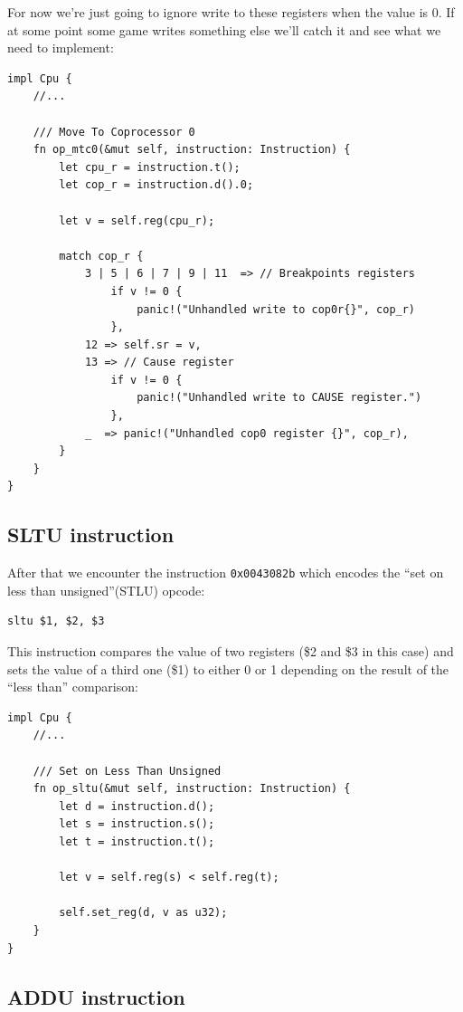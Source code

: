 \documentclass[a4paper]{article}
\newcommand{\code}[1] {\texttt{#1}}
\begin{document}
For now we're just going to ignore write to these registers when the
value is 0. If at some point some game writes something else we'll
catch it and see what we need to implement:

\begin{lstlisting}
impl Cpu {
    //...

    /// Move To Coprocessor 0
    fn op_mtc0(&mut self, instruction: Instruction) {
        let cpu_r = instruction.t();
        let cop_r = instruction.d().0;

        let v = self.reg(cpu_r);

        match cop_r {
            3 | 5 | 6 | 7 | 9 | 11  => // Breakpoints registers
                if v != 0 {
                    panic!("Unhandled write to cop0r{}", cop_r)
                },
            12 => self.sr = v,
            13 => // Cause register
                if v != 0 {
                    panic!("Unhandled write to CAUSE register.")
                },
            _  => panic!("Unhandled cop0 register {}", cop_r),
        }
    }
}
\end{lstlisting}

\subsection{SLTU instruction}

After that we encounter the instruction \code{0x0043082b} which
encodes the ``set on less than unsigned''(STLU) opcode:

\begin{lstlisting}[language=assembly]
sltu $1, $2, $3
\end{lstlisting}

This instruction compares the value of two registers (\$2 and \$3 in
this case) and sets the value of a third one (\$1) to either 0 or 1
depending on the result of the ``less than'' comparison:

\begin{lstlisting}
impl Cpu {
    //...

    /// Set on Less Than Unsigned
    fn op_sltu(&mut self, instruction: Instruction) {
        let d = instruction.d();
        let s = instruction.s();
        let t = instruction.t();

        let v = self.reg(s) < self.reg(t);

        self.set_reg(d, v as u32);
    }
}
\end{lstlisting}

\subsection{ADDU instruction}
\end{document}
